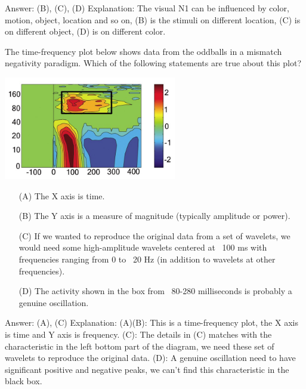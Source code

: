 \documentclass[a4 paper]{article}
\begin{document}
\begin{tcolorbox}[colback=YellowGreen!5!white,colframe=YellowGreen!75!black,title={Problem 9's answer}]
Answer: (B), (C), (D)\newline
Explanation:\newline
The visual N1 can be influenced by color, motion, object, location and so on, (B) is the stimuli on different location, (C) is on different object, (D) is on different color.
\end{tcolorbox}
\begin{tcolorbox}[colback=RubineRed!5!white,colframe=RubineRed!75!black]
The time-frequency plot below shows data from the oddballs in a mismatch negativity paradigm. Which of the following statements are true about this plot?
\begin{multicols*}{2}
\begin{center}
    \includegraphics[height=4.5cm]{figure/Time-Frequency.png}
\end{center}
\columnbreak
\begin{itemize}
    \item[(A)] The X axis is time.
    \item[(B)] The Y axis is a measure of magnitude (typically amplitude or power).
    \item[(C)] If we wanted to reproduce the original data from a set of wavelets, we would need some high-amplitude wavelets centered at ~100 ms with frequencies ranging from 0 to ~20 Hz (in addition to wavelets at other frequencies).
    \item[(D)] The activity shown in the box from ~80-280 milliseconds is probably a genuine oscillation.
\end{itemize}
\end{multicols*}
\end{tcolorbox}
\begin{tcolorbox}[colback=YellowGreen!5!white,colframe=YellowGreen!75!black,title={Problem 10's answer}]
Answer: (A), (C)\newline
Explanation:\newline
(A)(B): This is a time-frequency plot, the X axis is time and Y axis is frequency.\newline
(C): The details in (C) matches with the characteristic in the left bottom part of the diagram, we need these set of wavelets to reproduce the original data.\newline
(D): A genuine oscillation need to have significant positive and negative peaks, we can't find this characteristic in the black box.
\end{tcolorbox}
\end{document}
